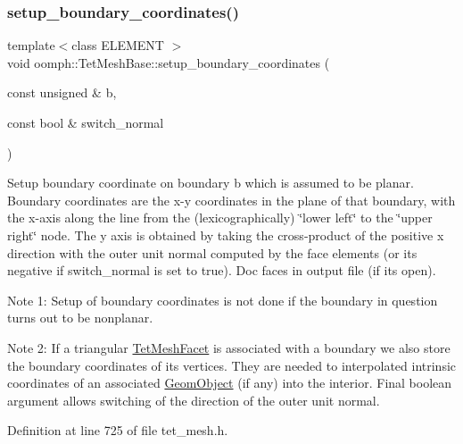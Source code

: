 \subsubsection{\texorpdfstring{setup\+\_\+boundary\+\_\+coordinates()}{setup\_boundary\_coordinates()}\hspace{0.1cm}{\footnotesize\ttfamily [2/4]}}
{\footnotesize\ttfamily template$<$class E\+L\+E\+M\+E\+NT $>$ \\
void oomph\+::\+Tet\+Mesh\+Base\+::setup\+\_\+boundary\+\_\+coordinates (\begin{DoxyParamCaption}\item[{const unsigned \&}]{b,  }\item[{const bool \&}]{switch\+\_\+normal }\end{DoxyParamCaption})\hspace{0.3cm}{\ttfamily [inline]}}



Setup boundary coordinate on boundary b which is assumed to be planar. Boundary coordinates are the x-\/y coordinates in the plane of that boundary, with the x-\/axis along the line from the (lexicographically) \char`\"{}lower left\char`\"{} to the \char`\"{}upper right\char`\"{} node. The y axis is obtained by taking the cross-\/product of the positive x direction with the outer unit normal computed by the face elements (or its negative if switch\+\_\+normal is set to true). Doc faces in output file (if it\textquotesingle{}s open). 

Note 1\+: Setup of boundary coordinates is not done if the boundary in question turns out to be nonplanar.

Note 2\+: If a triangular \hyperlink{classoomph_1_1TetMeshFacet}{Tet\+Mesh\+Facet} is associated with a boundary we also store the boundary coordinates of its vertices. They are needed to interpolated intrinsic coordinates of an associated \hyperlink{classoomph_1_1GeomObject}{Geom\+Object} (if any) into the interior. Final boolean argument allows switching of the direction of the outer unit normal. 

Definition at line 725 of file tet\+\_\+mesh.\+h.

\mbox{\label{classoomph_1_1TetMeshBase_a735a6e9b8ba1937d442965ca8546f8a5}} 
